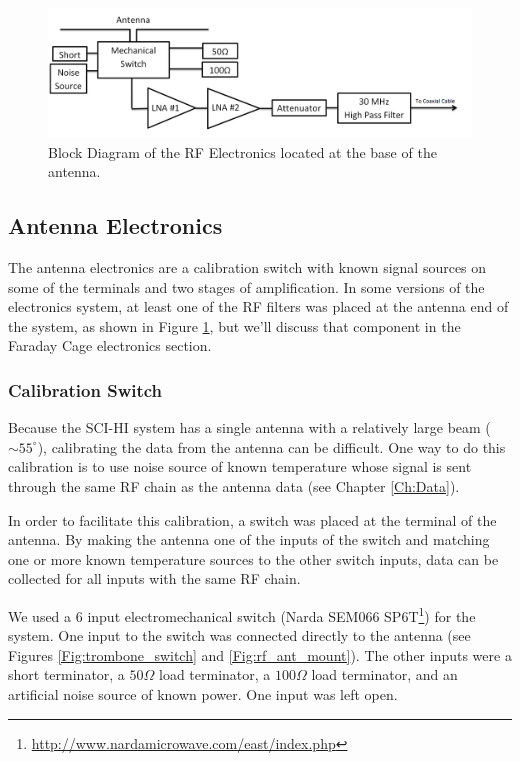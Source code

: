 \begin{figure}[htb]
\begin{center}
\includegraphics[width=0.9\linewidth]{SCIHI_system/figures/antenna_rf_block_diagram.png}
\caption{Block Diagram of the RF Electronics located at the base of the antenna.}
\label{Fig:antenna_RF_block_diagram}
\end{center}
\end{figure}

\subsection{Antenna Electronics}
The antenna electronics are a calibration switch with known signal sources on some of the terminals and two stages of amplification. In some versions of the electronics system, at least one of the RF filters was placed at the antenna end of the system, as shown in Figure \ref{Fig:antenna_RF_block_diagram}, but we'll discuss that component in the Faraday Cage electronics section. 

\subsubsection{Calibration Switch} \label{Sec:switch}
Because the SCI-HI system has a single antenna with a relatively large beam ($\sim 55^\circ$), calibrating the data from the antenna can be difficult. One way to do this calibration is to use noise source of known temperature whose signal is sent through the same RF chain as the antenna data (see Chapter \ref{Ch:Data}). 

In order to facilitate this calibration, a switch was placed at the terminal of the antenna. By making the antenna one of the inputs of the switch and matching one or more known temperature sources to the other switch inputs, data can be collected for all inputs with the same RF chain. 

We used a 6 input electromechanical switch (Narda SEM066 SP6T\footnote{\url{http://www.nardamicrowave.com/east/index.php}}) for the system. One input to the switch was connected directly to the antenna (see Figures \ref{Fig:trombone_switch} and \ref{Fig:rf_ant_mount}). The other inputs were a short terminator, a $50 \Omega$ load terminator, a $100 \Omega$ load terminator, and an artificial noise source of known power. One input was left open. 


